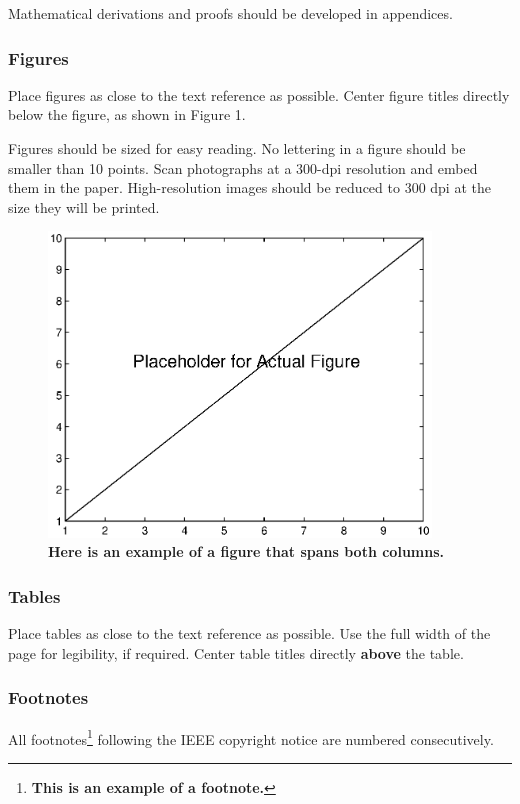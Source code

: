 \documentclass[twocolumn,letterpaper]{IEEEAerospaceCLS}  %
\begin{document}
Mathematical derivations and proofs should be developed in appendices.

\subsubsection{Figures}
Place figures as close to the text reference as possible. Center figure titles directly below the figure, as shown in Figure 1.

Figures should be sized for easy reading. No lettering in a figure should be smaller than 10 points. Scan photographs at a 300-dpi resolution and embed them in the paper. High-resolution images should be reduced to 300 dpi at the size they will be printed.

\begin{figure}
\centering
\includegraphics[width=4in]{Placeholder.eps}
\caption{\bf{Here is an example of a figure that spans both columns.}}
\label{FlowChart}
\end{figure}

\subsubsection{Tables}
Place tables as close to the text reference as possible. Use the full width of the page for legibility, if required. Center table titles directly {\bf above} the table.

\subsubsection{Footnotes}
All footnotes\footnote{\bf This is an example of a footnote.} following the IEEE copyright notice are numbered consecutively. 

\end{document}
